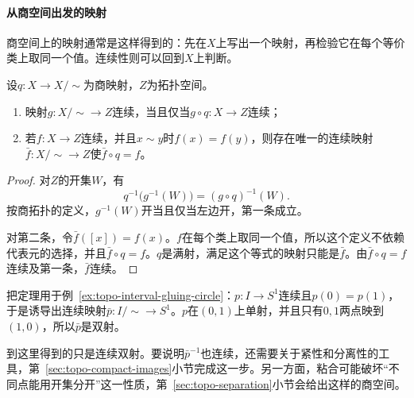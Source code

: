 \paragraph{从商空间出发的映射}
商空间上的映射通常是这样得到的：先在$X$上写出一个映射，再检验它在每个等价类上取同一个值。连续性则可以回到$X$上判断。

\begin{theorem}[商空间上的映射]
\label{thm:topo-quotient-maps}
设$q:X\to X/{\sim}$为商映射，$Z$为拓扑空间。
\begin{enumerate}
  \item 映射$g:X/{\sim}\to Z$连续，当且仅当$g\circ q:X\to Z$连续；
  \item 若$f:X\to Z$连续，并且$x\sim y$时$f(x)=f(y)$，则存在唯一的连续映射$\bar f:X/{\sim}\to Z$使$\bar f\circ q=f$。
\end{enumerate}
\end{theorem}
\begin{proof}
对$Z$的开集$W$，有
\[
 q^{-1}\bigl(g^{-1}(W)\bigr)=(g\circ q)^{-1}(W).
\]
按商拓扑的定义，$g^{-1}(W)$开当且仅当左边开，第一条成立。

对第二条，令$\bar f([x])=f(x)$。$f$在每个类上取同一个值，所以这个定义不依赖代表元的选择，并且$\bar f\circ q=f$。$q$是满射，满足这个等式的映射只能是$\bar f$。由$\bar f\circ q=f$连续及第一条，$\bar f$连续。
\end{proof}

把定理用于例~\ref{ex:topo-interval-gluing-circle}：$p:I\to S^1$连续且$p(0)=p(1)$，于是诱导出连续映射$\bar p:I/{\sim}\to S^1$。$p$在$(0,1)$上单射，并且只有$0,1$两点映到$(1,0)$，所以$\bar p$是双射。

到这里得到的只是连续双射。要说明$\bar p^{-1}$也连续，还需要关于紧性和分离性的工具，第~\ref{sec:topo-compact-images}小节完成这一步。另一方面，粘合可能破坏“不同点能用开集分开”这一性质，第~\ref{sec:topo-separation}小节会给出这样的商空间。
